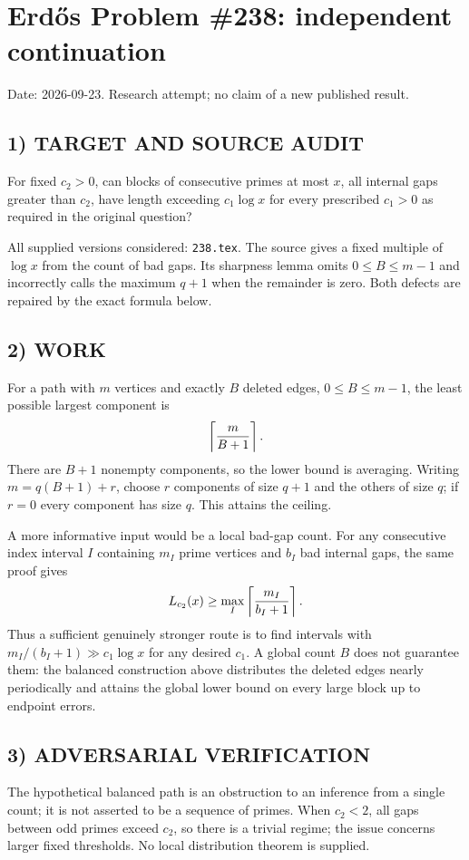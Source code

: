 \section{Erd\H{o}s Problem \#238: independent continuation}
\noindent Date: 2026-09-23. Research attempt; no claim of a new published result.
\subsection{1) TARGET AND SOURCE AUDIT}
For fixed $c_2>0$, can blocks of consecutive primes at most $x$, all internal gaps greater than $c_2$, have length exceeding $c_1\log x$ for every prescribed $c_1>0$ as required in the original question?

All supplied versions considered: \texttt{238.tex}.
The source gives a fixed multiple of $\log x$ from the count of bad gaps. Its sharpness lemma omits $0\le B\le m-1$ and incorrectly calls the maximum $q+1$ when the remainder is zero. Both defects are repaired by the exact formula below.
\subsection{2) WORK}
For a path with $m$ vertices and exactly $B$ deleted edges, $0\le B\le m-1$, the least possible largest component is
\[
\left\lceil{m\over B+1}\right\rceil.
\]
There are $B+1$ nonempty components, so the lower bound is averaging. Writing $m=q(B+1)+r$, choose $r$ components of size $q+1$ and the others of size $q$; if $r=0$ every component has size $q$. This attains the ceiling.

A more informative input would be a local bad-gap count. For any consecutive index interval $I$ containing $m_I$ prime vertices and $b_I$ bad internal gaps, the same proof gives
\[
L_{c_2}(x)\ge\max_I\left\lceil{m_I\over b_I+1}\right\rceil.
\]
Thus a sufficient genuinely stronger route is to find intervals with $m_I/(b_I+1)\gg c_1\log x$ for any desired $c_1$. A global count $B$ does not guarantee them: the balanced construction above distributes the deleted edges nearly periodically and attains the global lower bound on every large block up to endpoint errors.
\subsection{3) ADVERSARIAL VERIFICATION}
The hypothetical balanced path is an obstruction to an inference from a single count; it is not asserted to be a sequence of primes. When $c_2<2$, all gaps between odd primes exceed $c_2$, so there is a trivial regime; the issue concerns larger fixed thresholds. No local distribution theorem is supplied.
